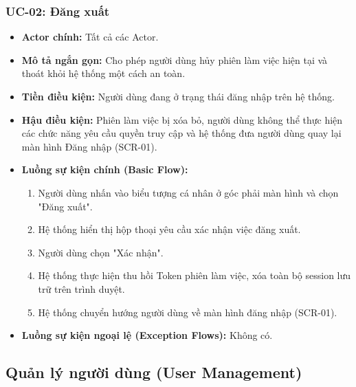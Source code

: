 \subsubsection{UC-02: Đăng xuất}
\label{subsubsec:uc02_logout}
\begin{itemize}
    \item \textbf{Actor chính:} Tất cả các Actor.
    \item \textbf{Mô tả ngắn gọn:} Cho phép người dùng hủy phiên làm việc hiện tại và thoát khỏi hệ thống một cách an toàn.
    \item \textbf{Tiền điều kiện:} Người dùng đang ở trạng thái đăng nhập trên hệ thống.
    \item \textbf{Hậu điều kiện:} Phiên làm việc bị xóa bỏ, người dùng không thể thực hiện các chức năng yêu cầu quyền truy cập và hệ thống đưa người dùng quay lại màn hình Đăng nhập (SCR-01).
    \item \textbf{Luồng sự kiện chính (Basic Flow):}
        \begin{enumerate}
            \item Người dùng nhấn vào biểu tượng cá nhân ở góc phải màn hình và chọn "Đăng xuất".
            \item Hệ thống hiển thị hộp thoại yêu cầu xác nhận việc đăng xuất.
            \item Người dùng chọn "Xác nhận".
            \item Hệ thống thực hiện thu hồi Token phiên làm việc, xóa toàn bộ session lưu trữ trên trình duyệt.
            \item Hệ thống chuyển hướng người dùng về màn hình đăng nhập (SCR-01).
        \end{enumerate}
    \item \textbf{Luồng sự kiện ngoại lệ (Exception Flows):} Không có.
\end{itemize}

\subsection{Quản lý người dùng (User Management)}
\label{subsec:srs_user_mgmt}

